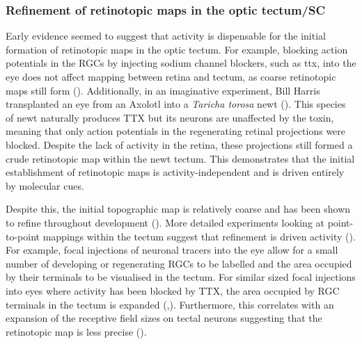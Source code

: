 \subsubsection{Refinement of retinotopic maps in the optic tectum/SC}

 Early evidence seemed to suggest that activity is dispensable for the initial formation of retinotopic maps in the optic tectum. For example, blocking action potentials in the RGCs by injecting sodium channel blockers, such as \gls{ttx}, into the eye does not affect mapping between retina and tectum, as coarse retinotopic maps still form (\cite{Kobayashi1990DisturbanceGrayanotoxin, Meyer1983TetrodotoxinGoldfish, Olson1991TheProjection}). Additionally, in an imaginative experiment, Bill Harris transplanted an eye from an Axolotl into a \textit{Taricha torosa} newt (\cite{Harris1980TheSalamanders}). This species of newt naturally produces TTX but its neurons are unaffected by the toxin, meaning that only action potentials in the regenerating retinal projections were blocked. Despite the lack of activity in the retina, these projections still formed a crude retinotopic map within the newt tectum. This demonstrates that the initial establishment of retinotopic maps is activity-independent and is driven entirely by molecular cues.

Despite this, the initial topographic map is relatively coarse and has been shown to refine throughout development (\cite{Gaze1974TheXenopus}). More detailed experiments looking at point-to-point mappings within the tectum suggest that refinement is driven activity (\cite{Ruthazer2004InsightsPerspective}). For example, focal injections of neuronal tracers into the eye allow for a small number of developing or regenerating RGCs to be labelled and the area occupied by their terminals to be visualised in the tectum.  For similar sized focal injections into eyes where activity has been blocked by TTX, the area occupied by RGC terminals in the tectum is expanded (\cite{Kobayashi1990DisturbanceGrayanotoxin, Olson1991TheProjection},). Furthermore, this correlates with an expansion of the receptive field sizes on tectal neurons suggesting that the retinotopic map is less precise (\cite{Schmidt1983ActivityGoldfish}).

